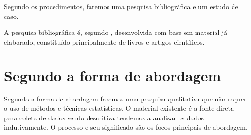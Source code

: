 Segundo os procedimentos, faremos uma pesquisa bibliográfica e um estudo de caso.

A pesquisa bibliográfica é, segundo \cite{AntonioCarlosGil}, desenvolvida com base em  material já elaborado, constituído principalmente de livros e artigos científicos.

\section{Segundo a forma de abordagem}

Segundo a forma de abordagem faremos uma pesquisa qualitativa que não requer o uso de métodos e técnicas estatísticas. O material existente é a fonte direta para coleta de dados sendo 
descritiva tendemos a analisar os dados indutivamente. O processo e seu significado são os focos principais de abordagem. \cite{TatianaEng}


